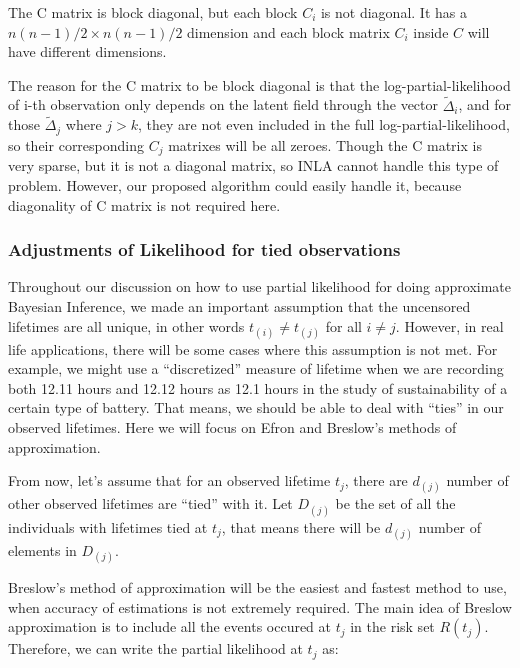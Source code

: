 \documentclass[]{article}
\begin{document}
The C matrix is block diagonal, but each block \(C_i\) is not diagonal.
It has a \(n(n-1)/2 \times n(n-1)/2\) dimension and each block matrix
\(C_i\) inside \(C\) will have different dimensions.

The reason for the C matrix to be block diagonal is that the
log-partial-likelihood of i-th observation only depends on the latent
field through the vector \(\tilde{\Delta}_i\), and for those
\(\tilde{\Delta}_j\) where \(j>k\), they are not even included in the
full log-partial-likelihood, so their corresponding \(C_j\) matrixes
will be all zeroes. Though the C matrix is very sparse, but it is not a
diagonal matrix, so INLA cannot handle this type of problem. However,
our proposed algorithm could easily handle it, because diagonality of C
matrix is not required here.

\hypertarget{adjustments-of-likelihood-for-tied-observations}{%
\subsubsection{Adjustments of Likelihood for tied
observations}\label{adjustments-of-likelihood-for-tied-observations}}

Throughout our discussion on how to use partial likelihood for doing
approximate Bayesian Inference, we made an important assumption that the
uncensored lifetimes are all unique, in other words
\(t_{(i)} \ne t_{(j)}\) for all \(i\neq j\). However, in real life
applications, there will be some cases where this assumption is not met.
For example, we might use a ``discretized'' measure of lifetime when we
are recording both 12.11 hours and 12.12 hours as 12.1 hours in the
study of sustainability of a certain type of battery. That means, we
should be able to deal with ``ties'' in our observed lifetimes. Here we
will focus on Efron and Breslow's methods of approximation.

From now, let's assume that for an observed lifetime \(t_j\), there are
\(d_{(j)}\) number of other observed lifetimes are ``tied'' with it. Let
\(D_{(j)}\) be the set of all the individuals with lifetimes tied at
\(t_j\), that means there will be \(d_{(j)}\) number of elements in
\(D_{(j)}\).

Breslow's method of approximation will be the easiest and fastest method
to use, when accuracy of estimations is not extremely required. The main
idea of Breslow approximation is to include all the events occured at
\(t_j\) in the risk set \(R(t_j)\). Therefore, we can write the partial
likelihood at \(t_j\) as:
\end{document}
